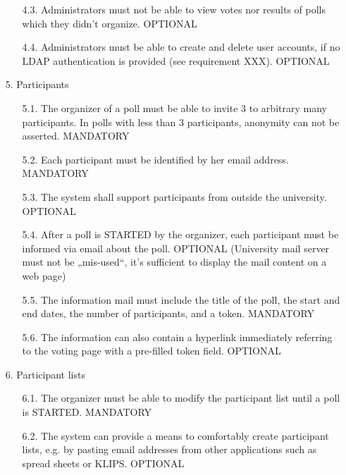 \begin{enumerate}
\begin{enumerate}
	
	\item[4.3.] Administrators must not be able to view votes nor results of polls which they didn't organize.
	OPTIONAL
	
	
	\item[4.4.] Administrators must be able to create and delete user accounts, if no LDAP authentication is
	provided (see requirement XXX). OPTIONAL
	\end{enumerate}




\item[5.] Participants

	\begin{enumerate}
	\item[5.1.] The organizer of a poll must be able to invite 3 to arbitrary many participants. In polls with
	less than 3 participants, anonymity can not be asserted. MANDATORY
	
	
	\item[5.2.] Each participant must be identified by her email address. MANDATORY
	
	
	\item[5.3.] The system shall support participants from outside the university. OPTIONAL
	
	
	\item[5.4.] After a poll is STARTED by the organizer, each participant must be informed via email about
	the poll. OPTIONAL (University mail server must not be „mis-used“, it’s sufficient to display
	the mail content on a web page)
	
	
	\item[5.5.] The information mail must include the title of the poll, the start and end dates, the number of
	participants, and a token. MANDATORY
	
	
	\item[5.6.] The information can also contain a hyperlink immediately referring to the voting page with a
	pre-filled token field. OPTIONAL
	\end{enumerate}




\item[6.] Participant lists

	\begin{enumerate}
	\item[6.1.] The organizer must be able to modify the participant list until a poll is STARTED. MANDATORY
	
	
	\item[6.2.] The system can provide a means to comfortably create participant lists, e.g. by pasting
	email addresses from other applications such as spread sheets or KLIPS. OPTIONAL
	

\end{enumerate}
\end{enumerate}
